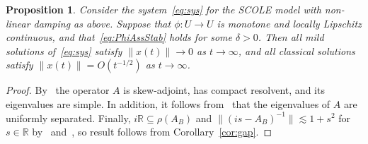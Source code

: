 \documentclass[11pt, a4paper]{amsart}
\newcommand{\RR}{\mathbb{R}}
\newtheorem{prp}[thm]{Proposition}
\theoremstyle{definition}
\numberwithin{equation}{section}
\begin{document}
\begin{prp}\label{prp:SCOLE}
Consider the system~\eqref{eq:sys} for the SCOLE model with non-linear damping as above. 
Suppose  that $\phi \colon U\to U$ is monotone and locally Lipschitz continuous, and that~\eqref{eq:PhiAssStab} holds for some $\delta>0$.
 Then all  mild solutions of~\eqref{eq:sys} satisfy $\|x(t)\|\to 0$ as $t\to\infty$, and all classical solutions satisfy $\|x(t)\|= O(t^{-1/2})$ as $t\to\infty$.
\end{prp}

\begin{proof}
By~\cite[Prop.~1.1]{GuoIva05} the operator $A$ is skew-adjoint, has compact resolvent, and its eigenvalues are simple.
In addition, it follows from~\cite[Prop.~1.2]{GuoIva05} that the eigenvalues of $A$ are uniformly separated.
Finally, $i\RR\subseteq \rho(A_B)$ and $\|(is-A_B)^{-1}\|\lesssim 1+s^2$ for $s\in\RR$  by~\cite[Thm.~3.1]{FkiPau25arxiv} and~\cite[Prop.~1.3]{BatDuy08}, so result follows from Corollary~\ref{cor:gap}.
\end{proof}
\end{document}
